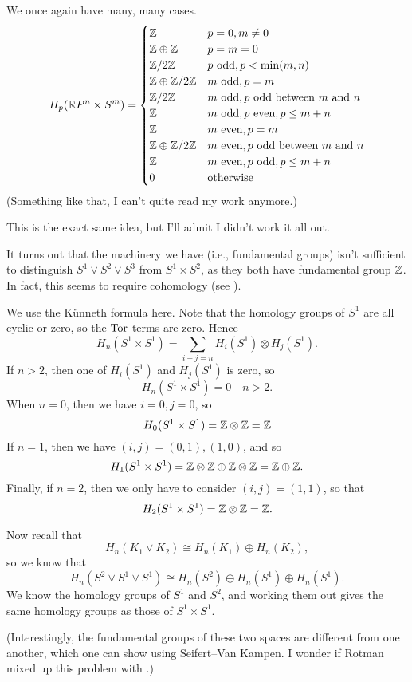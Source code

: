 \documentclass[../../solutions.tex]{subfiles}
\begin{document}
\begin{exercise} \leavevmode
We once again have many, many cases.
\[
H_p(\mathbb{R} P^n\times S^m)=
\begin{cases}
\mathbb{Z} & p=0,m\ne0 \\
\mathbb{Z}\oplus\mathbb{Z} & p=m=0 \\
\mathbb{Z}/2\mathbb{Z} & p~\text{odd},p<\min(m,n) \\
\mathbb{Z}\oplus\mathbb{Z}/2\mathbb{Z} & m~\text{odd},p=m \\
\mathbb{Z}/2\mathbb{Z} & m~\text{odd},p~\text{odd between}~m~\text{and}~n \\
\mathbb{Z} & m~\text{odd},p~\text{even},p\le m+n \\
\mathbb{Z} & m~\text{even},p=m \\
\mathbb{Z}\oplus\mathbb{Z}/2\mathbb{Z} & m~\text{even},p~\text{odd between}~m~\text{and}~n \\
\mathbb{Z} & m~\text{even},p~\text{odd},p\le m+n \\
0 & \text{otherwise}
\end{cases}
\]
(Something like that, I can't quite read my work anymore.)
\end{exercise}

\begin{exercise} \leavevmode
This is the exact same idea, but I'll admit I didn't work it all out.
\end{exercise}

\begin{exercise} \leavevmode
It turns out that the machinery we have (i.e., fundamental groups) isn't sufficient to distinguish $S^1\vee S^2\vee S^3$ from $S^1\times S^2$, as they both have fundamental group $\mathbb{Z}$.
In fact, this seems to require cohomology (see ).
\end{exercise}

\begin{exercise} \leavevmode
We use the K\"unneth formula here.
Note that the homology groups of $S^1$ are all cyclic or zero, so the $\operatorname{Tor}$ terms are zero.
Hence
\[H_n(S^1\times S^1)=\sum_{i+j=n}H_i(S^1)\otimes H_j(S^1).\]
If $n>2$, then one of $H_i(S^1)$ and $H_j(S^1)$ is zero, so
\[H_n(S^1\times S^1)=0\quad n>2.\]
When $n=0$, then we have $i=0,j=0$, so
\[H_0(S^1\times S^1)=\mathbb{Z}\otimes\mathbb{Z}=\mathbb{Z}\]
If $n=1$, then we have $(i,j)=(0,1),(1,0)$, and so
\[H_1(S^1\times S^1)=\mathbb{Z}\otimes\mathbb{Z}\oplus\mathbb{Z}\otimes\mathbb{Z}=\mathbb{Z}\oplus\mathbb{Z}.\]
Finally, if $n=2$, then we only have to consider $(i,j)=(1,1)$, so that
\[H_2(S^1\times S^1)=\mathbb{Z}\otimes\mathbb{Z}=\mathbb{Z}.\]

Now recall that
\[H_n(K_1\vee K_2)\cong H_n(K_1)\oplus H_n(K_2),\]
so we know that
\[H_n(S^2\vee S^1\vee S^1)\cong H_n(S^2)\oplus H_n(S^1)\oplus H_n(S^1).\]
We know the homology groups of $S^1$ and $S^2$, and working them out gives the same homology groups as those of $S^1\times S^1$.

(Interestingly, the fundamental groups of these two spaces are different from one another, which one can show using Seifert--Van Kampen.
I wonder if Rotman mixed up this problem with .)
\end{exercise}
\end{document}

